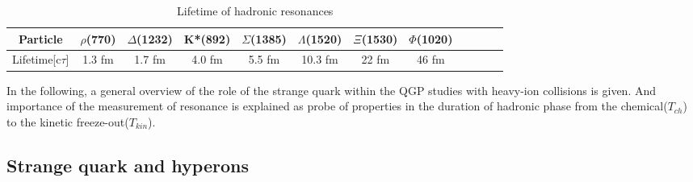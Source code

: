 \begin{table}[h!]
\begin{center}

\begin{tabular}{|c|c|c|c|c|c|c|clc|c|c|}
\hline
Particle & $\rho$(770) & $\Delta$(1232) &K*(892) & $\Sigma$(1385) &$\Lambda$(1520) & $\Xi$(1530)& $\Phi$(1020)\\
\hline
Lifetime[c$\tau$] &  1.3 fm &1.7 fm & 4.0 fm& 5.5 fm& 10.3 fm & 22 fm& 46 fm\\
\hline
\end{tabular}
\caption{Lifetime of hadronic resonances}\label{table:rsnptl}
\end{center}
\end{table}



In the following, a general overview of the role of the strange quark within the QGP studies with heavy-ion collisions is given.
And importance of the measurement of resonance is explained as probe of properties in the duration of hadronic phase from the chemical($T_{ch}$) to the kinetic freeze-out($T_{kin}$). 



\subsection{Strange quark and hyperons}
  
